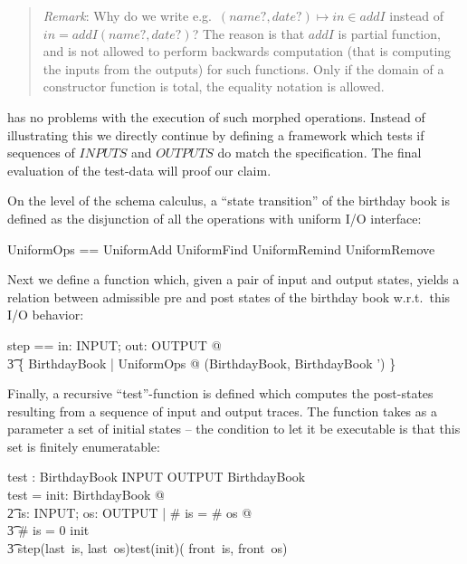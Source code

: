 \documentclass{article}
\newenvironment{remark}
{\begin{small}\begin{quote}\emph{Remark}: }{\end{quote}\end{small}}
\begin{document}
\begin{remark}
  Why do we write e.g.~$(name?,date?) \mapsto in \in addI$ instead of
  $in = addI(name?,date?)$? The reason is that $addI$ is partial
  function, and \ZAP{} is not allowed to perform backwards
  computation (that is computing the inputs from the outputs) 
  for such functions. Only if the domain of a constructor function
  is total, the equality notation is allowed.
\end{remark}

\ZAP{} has no problems with the execution of such morphed operations.
Instead of illustrating this we directly continue by defining a
framework which tests if sequences of $INPUTS$ and $OUTPUTS$ do match
the specification. The final evaluation of the test-data will proof
our claim.

On the level of the schema calculus, a ``state transition'' of the
birthday book is defined as the disjunction of all the 
operations with uniform I/O interface:

\begin{zed}
  UniformOps == UniformAdd \lor UniformFind \lor UniformRemind \lor UniformRemove
\end{zed}

Next we define a function which, given a pair of input and
output states, yields a relation between admissible pre and post states
of the birthday book w.r.t.~this I/O behavior:

\begin{axdef}
  step == \lambda in: INPUT; out: OUTPUT @ \\\t3
\{ \Delta BirthdayBook | UniformOps @ (\theta BirthdayBook, \theta BirthdayBook ') \}
\end{axdef}


Finally, a recursive ``test''-function is defined which computes the
post-states resulting from a sequence of input and output traces. The
function takes as a parameter a set of initial states -- the condition
to let it be executable is that this set is finitely enumeratable:

\begin{axdef}
  test : \power BirthdayBook \fun 
             \seq INPUT \cross \seq OUTPUT \fun  \power  BirthdayBook\\
\where
  test = \lambda  init: \power BirthdayBook @ \\\t2
          \lambda  is: \seq INPUT; os: \seq OUTPUT | \# is =  \# os @\\\t3
           \IF \# is = 0 \THEN init \\\t3
           \ELSE  step(last~is, last~os)\limg  test(init)( front~is, front~os) \rimg 
\end{axdef}
\end{document}
